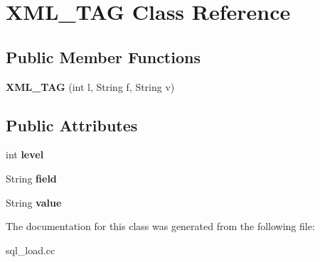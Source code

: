 \hypertarget{classXML__TAG}{}\section{X\+M\+L\+\_\+\+T\+AG Class Reference}
\label{classXML__TAG}
\subsection*{Public Member Functions}
\begin{DoxyCompactItemize}
\item 
\mbox{\label{classXML__TAG_a80b4a3db611b423bd39175e1437bb571}} 
{\bfseries X\+M\+L\+\_\+\+T\+AG} (int l, String f, String v)
\end{DoxyCompactItemize}
\subsection*{Public Attributes}
\begin{DoxyCompactItemize}
\item 
\mbox{\label{classXML__TAG_a4b8e7e0b458ec36c34d7a4558b558d7a}} 
int {\bfseries level}
\item 
\mbox{\label{classXML__TAG_a42d570f74198691bc1d47725327d7715}} 
String {\bfseries field}
\item 
\mbox{\label{classXML__TAG_ad691024bb7a36f5e180712d8c9451bcd}} 
String {\bfseries value}
\end{DoxyCompactItemize}


The documentation for this class was generated from the following file\+:\begin{DoxyCompactItemize}
\item 
sql\+\_\+load.\+cc\end{DoxyCompactItemize}
